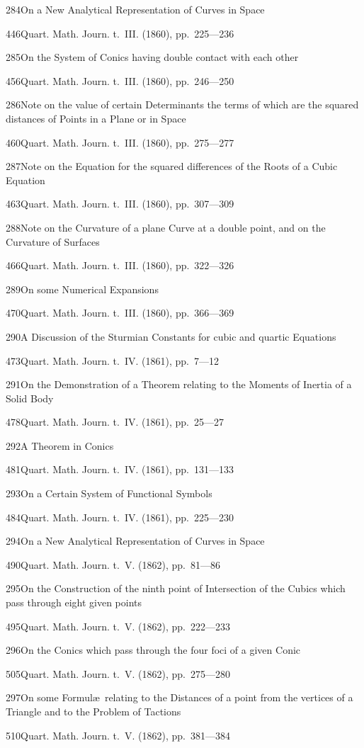 \documentclass[11pt,a4paper]{book}
\providecommand{\tocentry}[2]{#1\dotfill #2\par}
\begin{document}
\tocentry{284}{On a New Analytical Representation of Curves in Space}{446}{Quart. Math. Journ. t.~III. (1860), pp.~225---236}

\tocentry{285}{On the System of Conics having double contact with each other}{456}{Quart. Math. Journ. t.~III. (1860), pp.~246---250}

\tocentry{286}{Note on the value of certain Determinants the terms of which are the squared distances of Points in a Plane or in Space}{460}{Quart. Math. Journ. t.~III. (1860), pp.~275---277}

\tocentry{287}{Note on the Equation for the squared differences of the Roots of a Cubic Equation}{463}{Quart. Math. Journ. t.~III. (1860), pp.~307---309}

\tocentry{288}{Note on the Curvature of a plane Curve at a double point, and on the Curvature of Surfaces}{466}{Quart. Math. Journ. t.~III. (1860), pp.~322---326}

\tocentry{289}{On some Numerical Expansions}{470}{Quart. Math. Journ. t.~III. (1860), pp.~366---369}

\tocentry{290}{A Discussion of the Sturmian Constants for cubic and quartic Equations}{473}{Quart. Math. Journ. t.~IV. (1861), pp.~7---12}

\tocentry{291}{On the Demonstration of a Theorem relating to the Moments of Inertia of a Solid Body}{478}{Quart. Math. Journ. t.~IV. (1861), pp.~25---27}

\tocentry{292}{A Theorem in Conics}{481}{Quart. Math. Journ. t.~IV. (1861), pp.~131---133}

\tocentry{293}{On a Certain System of Functional Symbols}{484}{Quart. Math. Journ. t.~IV. (1861), pp.~225---230}

\newpage

\tocentry{294}{On a New Analytical Representation of Curves in Space}{490}{Quart. Math. Journ. t.~V. (1862), pp.~81---86}

\tocentry{295}{On the Construction of the ninth point of Intersection of the Cubics which pass through eight given points}{495}{Quart. Math. Journ. t.~V. (1862), pp.~222---233}

\tocentry{296}{On the Conics which pass through the four foci of a given Conic}{505}{Quart. Math. Journ. t.~V. (1862), pp.~275---280}

\tocentry{297}{On some Formul\ae\ relating to the Distances of a point from the vertices of a Triangle and to the Problem of Tactions}{510}{Quart. Math. Journ. t.~V. (1862), pp.~381---384}
\end{document}
